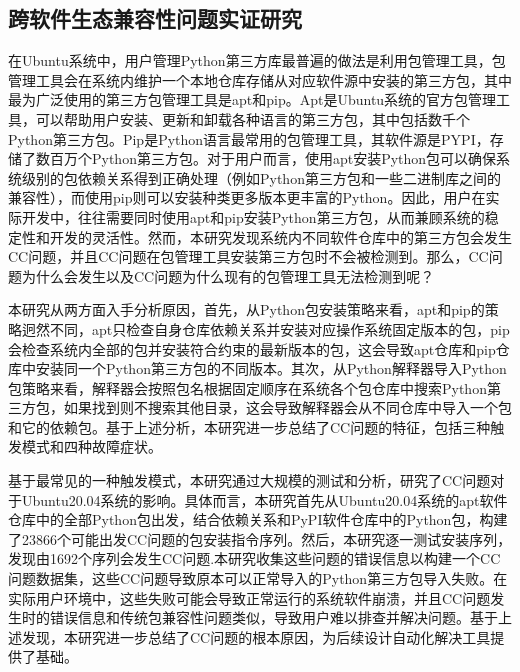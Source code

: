 \subsection{跨软件生态兼容性问题实证研究}\label{1.3.1}
在Ubuntu系统中，用户管理Python第三方库最普遍的做法是利用包管理工具，包管理工具会在系统内维护一个本地仓库存储从对应软件源中安装的第三方包，其中最为广泛使用的第三方包管理工具是apt和pip。Apt是Ubuntu系统的官方包管理工具，可以帮助用户安装、更新和卸载各种语言的第三方包，其中包括数千个Python第三方包。Pip是Python语言最常用的包管理工具，其软件源是PYPI，存储了数百万个Python第三方包。对于用户而言，使用apt安装Python包可以确保系统级别的包依赖关系得到正确处理（例如Python第三方包和一些二进制库之间的兼容性），而使用pip则可以安装种类更多版本更丰富的Python。因此，用户在实际开发中，往往需要同时使用apt和pip安装Python第三方包，从而兼顾系统的稳定性和开发的灵活性。然而，本研究发现系统内不同软件仓库中的第三方包会发生CC问题，并且CC问题在包管理工具安装第三方包时不会被检测到。那么，CC问题为什么会发生以及CC问题为什么现有的包管理工具无法检测到呢？

本研究从两方面入手分析原因，首先，从Python包安装策略来看，apt和pip的策略迥然不同，apt只检查自身仓库依赖关系并安装对应操作系统固定版本的包，pip会检查系统内全部的包并安装符合约束的最新版本的包，这会导致apt仓库和pip仓库中安装同一个Python第三方包的不同版本。其次，从Python解释器导入Python包策略来看，解释器会按照包名根据固定顺序在系统各个包仓库中搜索Python第三方包，如果找到则不搜索其他目录，这会导致解释器会从不同仓库中导入一个包和它的依赖包。基于上述分析，本研究进一步总结了CC问题的特征，包括三种触发模式和四种故障症状。

基于最常见的一种触发模式，本研究通过大规模的测试和分析，研究了CC问题对于Ubuntu20.04系统的影响。具体而言，本研究首先从Ubuntu20.04系统的apt软件仓库中的全部Python包出发，结合依赖关系和PyPI软件仓库中的Python包，构建了23866个可能出发CC问题的包安装指令序列。然后，本研究逐一测试安装序列，发现由1692个序列会发生CC问题.本研究收集这些问题的错误信息以构建一个CC问题数据集，这些CC问题导致原本可以正常导入的Python第三方包导入失败。在实际用户环境中，这些失败可能会导致正常运行的系统软件崩溃，并且CC问题发生时的错误信息和传统包兼容性问题类似，导致用户难以排查并解决问题。基于上述发现，本研究进一步总结了CC问题的根本原因，为后续设计自动化解决工具提供了基础。
